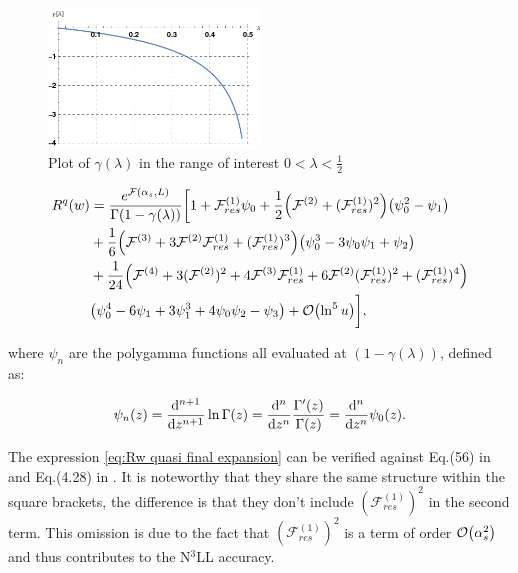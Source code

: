\documentclass[../Tesi_Jiahao_Miao_986136.tex]{subfiles}
\begin{document}
\begin{figure}
    \centering
    \includegraphics[width=0.5\textwidth]{figures/gamma_lambda.png}
    \caption{Plot of $\gamma(\lambda)$ in the range of interest $0<\lambda<\frac{1}{2}$}
    \label{fig:gamma_lambda}
\end{figure}
 
\begin{align}
    \begin{split}\label{eq:Rw quasi final expansion}
        R^q(w) &= \frac{e^{\mathcal{F}(\alpha_s,L)}}{\Gamma(1-\gamma(\lambda))} \biggl[ 1 + \mathcal{F}^{(1)}_{res} \psi_0 + \frac{1}{2}\qty( \mathcal{F}^{(2)}+(\mathcal{F}^{(1)}_{res})^2) \qty(\psi_0^2-\psi_1) \\
        &+ \frac{1}{6}\qty(\mathcal{F}^{(3)} + 3 \mathcal{F}^{(2)}\mathcal{F}^{(1)}_{res} + (\mathcal{F}^{(1)}_{res})^3 ) \qty(\psi_0^3 -3 \psi_0\psi_1+\psi_2) \\
        &+ \frac{1}{24}\qty(\mathcal{F}^{(4)} + 3(\mathcal{F}^{(2)})^2 + 4 \mathcal{F}^{(3)} \mathcal{F}^{(1)}_{res} + 6 \mathcal{F}^{(2)} (\mathcal{F}^{(1)}_{res})^2 + (\mathcal{F}^{(1)}_{res})^4 ) \\
        &\qty(\psi_0^4 -6 \psi_1 + 3\psi_1^3 +4\psi_0\psi_2 -\psi_3)+ \order{\ln^5 u} \biggr],
    \end{split}
\end{align}

where $\psi_n$ are the polygamma functions all evaluated at $(1-\gamma(\lambda))$, defined as:

\begin{equation}
    \psi_n (z) = \dv[n+1]{z} \ln \Gamma(z) = \dv[n]{z} \frac{\Gamma '(z)}{\Gamma(z)} = \dv[n]{z} \psi_0(z).
\end{equation}

The expression \cref{eq:Rw quasi final expansion} can be verified against Eq.(56) in \cite{Aglietti:2002ew} and Eq.(4.28) in \cite{Monni:2011gb}.
It is noteworthy that they share the same structure within the square brackets, the difference is that they don't include $(\mathcal{F}^{(1)}_{res})^2$ in the second term.
This omission is due to the fact that $(\mathcal{F}^{(1)}_{res})^2$ is a term of order $\order{\alpha_s^2}$ and thus contributes to the N$^3$LL accuracy.
\end{document}
